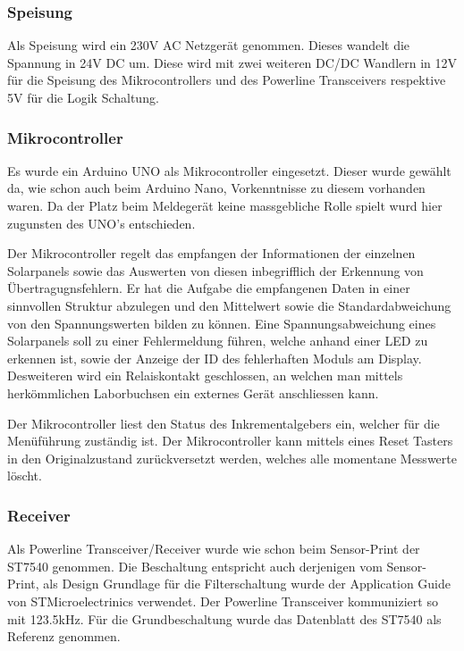 \subsubsection{Speisung}
Als Speisung wird ein 230V AC Netzgerät genommen. Dieses wandelt die Spannung in 24V DC um. Diese wird mit zwei weiteren DC/DC Wandlern in 12V für die Speisung des Mikrocontrollers und des Powerline Transceivers respektive 5V für die Logik Schaltung.

\subsubsection{Mikrocontroller}
Es wurde ein Arduino UNO als Mikrocontroller eingesetzt. Dieser wurde gewählt da, wie schon auch beim Arduino Nano, Vorkenntnisse zu diesem vorhanden waren. Da der Platz beim Meldegerät keine massgebliche Rolle spielt wurd hier zugunsten des UNO's entschieden.

Der Mikrocontroller regelt das empfangen der Informationen der einzelnen Solarpanels sowie das Auswerten von diesen inbegrifflich der Erkennung von Übertragugnsfehlern. Er hat die Aufgabe die empfangenen Daten in einer sinnvollen Struktur abzulegen und den Mittelwert sowie die Standardabweichung von den Spannungswerten bilden zu können. Eine Spannungsabweichung eines Solarpanels soll zu einer Fehlermeldung führen, welche anhand einer LED zu erkennen ist, sowie der Anzeige der ID des fehlerhaften Moduls am Display. Desweiteren wird ein Relaiskontakt geschlossen, an welchen man mittels herkömmlichen Laborbuchsen ein externes Gerät anschliessen kann.

Der Mikrocontroller liest den Status des Inkrementalgebers ein, welcher für die Menüführung zuständig ist. Der Mikrocontroller kann mittels eines Reset Tasters in den Originalzustand zurückversetzt werden, welches alle momentane Messwerte löscht.

\subsubsection{Receiver}
Als Powerline Transceiver/Receiver wurde wie schon beim Sensor-Print der ST7540 genommen. Die Beschaltung entspricht auch derjenigen vom Sensor-Print, als Design Grundlage für die Filterschaltung wurde der Application Guide \cite[p. 48]{Applic_Guide_ST7540} von STMicroelectrinics verwendet. Der Powerline Transceiver kommuniziert so mit 123.5kHz. Für die Grundbeschaltung wurde das Datenblatt des ST7540 \cite[p. 40]{Datasheet_ST7540} als Referenz genommen.


